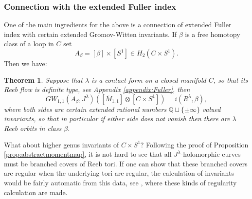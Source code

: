 \documentclass{amsart}
\numberwithin{equation}{section}
\newtheorem{theorem}[equation]{Theorem}
\theoremstyle{definition}
\theoremstyle{remark}
\newtheorem{remark}[equation]{Remark}
\begin{document}
\subsubsection {Connection with the extended Fuller index} 
One of the main ingredients for the above is a connection of extended Fuller index with certain extended Gromov-Witten invariants.
If $\beta$ is a free homotopy class of a loop in $C$ set $${A} _{\beta}= [\beta] \times [S ^{1}] \in H _{2} (C \times S ^{1} ).$$
Then we have: 
\begin{theorem} \label{thm:GWFullerMain1} 
Suppose that $\lambda$ is a contact form on a closed manifold $C$, so that its Reeb flow is definite type, see Appendix \ref{appendix:Fuller}, then 
\begin{equation*}
   GW _{1,1} (A _{\beta},J ^{\lambda} ) ([\overline {M} _{1,1} ] \otimes [C \times S ^{1} ]) = i (R ^{\lambda}, \beta),
\end{equation*}
where both sides are certain extended rational numbers $\mathbb{Q} \sqcup \{\pm \infty\}$ valued invariants, so that in particular if either side does not vanish then there are $\lambda$ Reeb orbits in class $\beta$.
\end{theorem} %
What about higher genus invariants of $C \times S ^{1} $? Following the proof of Proposition \ref{prop:abstractmomentmap}, it is not hard to see that all $J ^{\lambda} $-holomorphic curves must be branched covers of Reeb tori. If one can show that these branched covers are 
regular when the underlying tori are regular, the calculation of invariants would be fairly  automatic from this data, see \cite{citeWendlSuperRigid}, \cite{citeWendlChris} where these kinds of regularity calculation are made.
\end{document}
